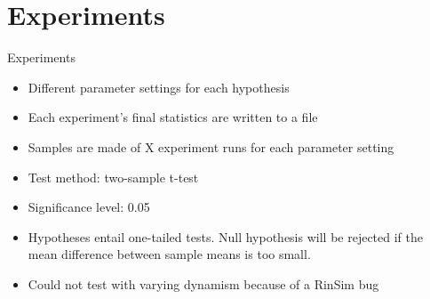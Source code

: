 \section{Experiments}

\begin{frame}{Experiments}
    \begin{itemize}
        \item Different parameter settings for each hypothesis
        \item Each experiment's final statistics are written to a file
        \item Samples are made of X experiment runs for each parameter setting
        \item Test method: two-sample t-test %
        \item Significance level: 0.05
        \item Hypotheses entail one-tailed tests. Null hypothesis will be rejected if the mean difference between sample means is too small.
        \vspace{2pt}
        \item Could not test with varying dynamism because of a RinSim bug
    \end{itemize}
\end{frame}

